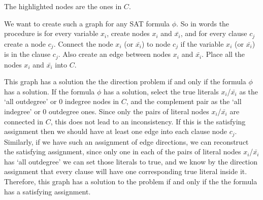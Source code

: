 \documentclass[english]{article}
\begin{document}

The highlighted nodes are the ones in $C$. 

We want to create such a graph for any SAT formula $\phi$. So in words the procedure is for every variable $x_i$,
create nodes $x_i$ and $\bar{x_i}$, and for every clause $c_j$ create a node $c_j$. Connect the node $x_i$
(or $\bar{x_i}$) to node $c_j$ if the variable $x_i$ (or $\bar{x_i}$) is in the clause $c_j$. Also create an edge
between nodes $x_i$ and $\bar{x_i}$. Place all the nodes $x_i$ and $\bar{x_i}$ into $C$. 

This graph has a solution the the direction problem if and only if the formula $\phi$ has a solution. If the
formula $\phi$ has a solution, select the true literals $x_i$/$\bar{x_i}$ as the `all outdegree' or 0 indegree nodes
in $C$, and the complement pair as the `all indegree' or 0 outdegree ones. Since only the pairs of literal nodes
$x_i$/$\bar{x_i}$ are connected in $C$, this does not lead to an inconsistency. If this is the satisfying assignment
then we should have at least one edge into each clause node $c_j$. Similarly, if we have such an assignment of edge
directions, we can reconstruct the satisfying assignment, since only one in each of the pairs of literal nodes
$x_i$/$\bar{x_i}$ has `all outdegree' we can set those literals to true, and we know by the direction assignment
that every clause will have one corresponding true literal inside it. Therefore, this graph has a solution to the
problem if and only if the the formula has a satisfying assignment. 
\end{document}
